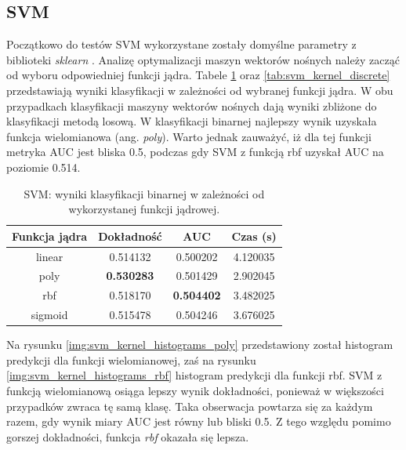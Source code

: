 \documentclass[a4paper, twoside, 11pt, openright]{article}
\begin{document}
\subsection{SVM}

Początkowo do testów SVM wykorzystane zostały domyślne parametry z biblioteki \textit{sklearn} \cite{bib:sklearnsvm}. Analizę optymalizacji maszyn wektorów nośnych należy zacząć od wyboru odpowiedniej funkcji jądra. Tabele \ref{tab:svm_kernel_binary} oraz \ref{tab:svm_kernel_discrete} przedstawiają wyniki klasyfikacji w zależności od wybranej funkcji jądra. W obu przypadkach klasyfikacji maszyny wektorów nośnych dają wyniki zbliżone do klasyfikacji metodą losową. W klasyfikacji binarnej najlepszy wynik uzyskała funkcja wielomianowa (ang. \textit{poly}). Warto jednak zauważyć, iż dla tej funkcji metryka AUC jest bliska 0.5, podczas gdy SVM z funkcją rbf uzyskał AUC na poziomie 0.514.

\begin{table}[H]
    \centering
    \begin{tabular}{|c|c|c|c|}
    \hline
        \textbf{Funkcja jądra} & \textbf{Dokładność} & \textbf{AUC} & \textbf{Czas (s)} \\ \hline
linear  &  0.514132 &  0.500202 &    4.120035 \\ \hline
poly    &  \textbf{0.530283} &  0.501429 &    2.902045 \\ \hline
rbf     &  0.518170 &  \textbf{0.504402} &    3.482025 \\ \hline
sigmoid &  0.515478 &  0.504246 &    3.676025 \\ \hline
    \end{tabular}
    \caption{SVM: wyniki klasyfikacji binarnej w zależności od wykorzystanej funkcji jądrowej.}
    \label{tab:svm_kernel_binary}
\end{table}

 Na rysunku \ref{img:svm_kernel_histograms_poly} przedstawiony został histogram predykcji dla funkcji wielomianowej, zaś na rysunku \ref{img:svm_kernel_histograms_rbf} histogram predykcji dla funkcji rbf. SVM z funkcją wielomianową osiąga lepszy wynik dokładności, ponieważ w większości przypadków zwraca tę samą klasę. Taka obserwacja powtarza się za każdym razem, gdy wynik miary AUC jest równy lub bliski 0.5. Z tego względu pomimo gorszej dokładności, funkcja \textit{rbf} okazała się lepsza.
\end{document}
